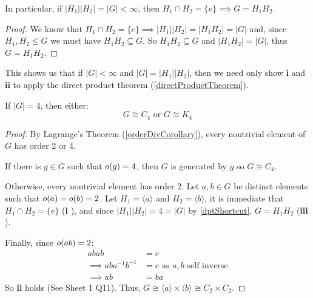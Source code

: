 \documentclass[../main.tex]{subfiles}
\begin{document}
\begin{corollary}
  In particular, if $|H_1||H_2| = |G| < \infty$, then $H_1 \cap H_2 = \{e\} \implies G = H_1 H_2$. \label{dptShortcut}
\end{corollary}
\begin{proof}
  We know that $H_1 \cap H_2 = \{e\} \implies |H_1||H_2| = |H_1H_2| = |G|$ and, since $H_1, H_2 \leq G$ we must have $H_1H_2 \subseteq G$.
  So $H_1H_2 \subseteq G$ and $|H_1H_2| = |G|$, thus $G = H_1 H_2$.
\end{proof}
\begin{remark}
  This shows us that if $|G| < \infty$ and $|G| = |H_1||H_2|$, then we need only show \textbf{i} and \textbf{ii} to apply the direct product theorem (\cref{directProductTheorem}).
\end{remark}
\begin{lemma}
  If $|G| = 4$, then either:
  \[
    G \cong C_4 \text{ or } G \cong K_4
  \]
\end{lemma}
\begin{proof}
  By Lagrange's Theorem (\cref{orderDivCorollary}), every nontrivial element of $G$ has order 2 or 4.

  If there is $g \in G$ such that $o(g) = 4$, then $G$ is generated by $g$ so $G \cong C_4$.

  Otherwise, every nontrivial element has order 2.
  Let $a, b \in G$ be distinct elements such that $o(a) = o(b) = 2$.
  Let $H_1 = \langle a \rangle$ and $H_2 = \langle b \rangle$, it is immediate that $H_1 \cap H_2 = \{e\}$ (\textbf{i} \tick), and since $|H_1||H_2| = 4 = |G|$ by \cref{dptShortcut}, $G = H_1H_2$ (\textbf{iii} \tick).

  Finally, since $o(ab) = 2$:
  \begin{align*}
    abab &= e \\
    \implies aba^{-1}b^{-1} &= e \text{ as $a, b$ self inverse} \\
    \implies ab &= ba
  \end{align*}
  So \textbf{ii} holds (See Sheet 1 Q11).
  Thus, $G \cong \langle a \rangle \times \langle b \rangle \cong C_2 \times C_2$.
\end{proof}
\end{document}
